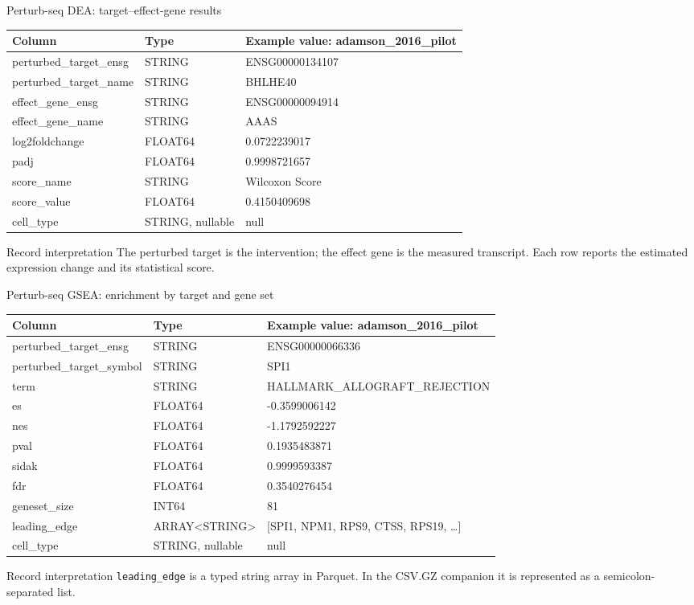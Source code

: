 \documentclass[handout,aspectratio=169]{beamer}
\begin{document}
\begin{frame}{Perturb-seq DEA: target--effect-gene results}
  \scriptsize
  \begin{tabularx}{\textwidth}{@{}>{\ttfamily}l l X@{}}
    \toprule
    \textbf{Column} & \textbf{Type} & \textbf{Example value: adamson\_2016\_pilot} \\
    \midrule
    perturbed\_target\_ensg & STRING & ENSG00000134107 \\
    perturbed\_target\_name & STRING & BHLHE40 \\
    effect\_gene\_ensg & STRING & ENSG00000094914 \\
    effect\_gene\_name & STRING & AAAS \\
    log2foldchange & FLOAT64 & 0.0722239017 \\
    padj & FLOAT64 & 0.9998721657 \\
    score\_name & STRING & Wilcoxon Score \\
    score\_value & FLOAT64 & 0.4150409698 \\
    cell\_type & STRING, nullable & null \\
    \bottomrule
  \end{tabularx}
  \vfill
  \begin{block}{Record interpretation}
    The perturbed target is the intervention; the effect gene is the measured transcript. Each row reports the estimated expression change and its statistical score.
  \end{block}
\end{frame}

\begin{frame}{Perturb-seq GSEA: enrichment by target and gene set}
  \scriptsize
  \begin{tabularx}{\textwidth}{@{}>{\ttfamily}l l X@{}}
    \toprule
    \textbf{Column} & \textbf{Type} & \textbf{Example value: adamson\_2016\_pilot} \\
    \midrule
    perturbed\_target\_ensg & STRING & ENSG00000066336 \\
    perturbed\_target\_symbol & STRING & SPI1 \\
    term & STRING & HALLMARK\_ALLOGRAFT\_REJECTION \\
    es & FLOAT64 & -0.3599006142 \\
    nes & FLOAT64 & -1.1792592227 \\
    pval & FLOAT64 & 0.1935483871 \\
    sidak & FLOAT64 & 0.9999593387 \\
    fdr & FLOAT64 & 0.3540276454 \\
    geneset\_size & INT64 & 81 \\
    leading\_edge & ARRAY<STRING> & [SPI1, NPM1, RPS9, CTSS, RPS19, \ldots] \\
    cell\_type & STRING, nullable & null \\
    \bottomrule
  \end{tabularx}
  \vfill
  \begin{block}{Record interpretation}
    \texttt{leading\_edge} is a typed string array in Parquet. In the CSV.GZ companion it is represented as a semicolon-separated list.
  \end{block}
\end{frame}
\end{document}
